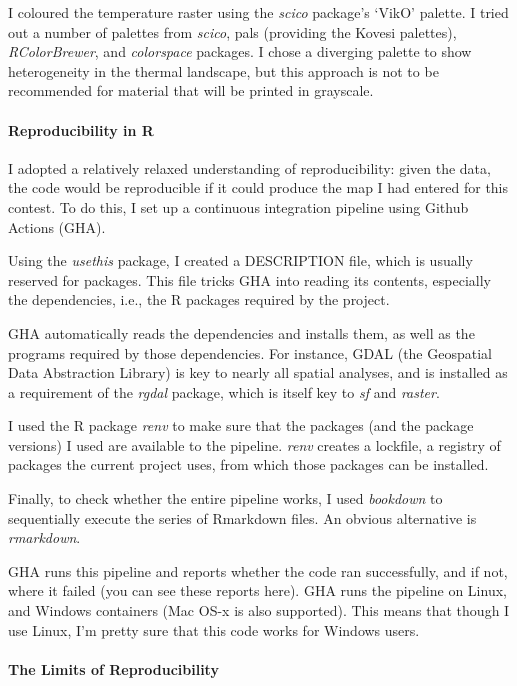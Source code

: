 	I coloured the temperature raster using the \textit{scico} package's `VikO' palette. I tried out a number of palettes from \textit{scico}, pals (providing the Kovesi palettes), \textit{RColorBrewer}, and \textit{colorspace} packages. I chose a diverging palette to show heterogeneity in the thermal landscape, but this approach is not to be recommended for material that will be printed in grayscale.

	\paragraph*{Reproducibility in R}

	I adopted a relatively relaxed understanding of reproducibility: given the data, the code would be reproducible if it could produce the map I had entered for this contest. To do this, I set up a continuous integration pipeline using Github Actions (GHA).

	Using the \textit{usethis} package, I created a DESCRIPTION file, which is usually reserved for packages. This file tricks GHA into reading its contents, especially the dependencies, i.e., the R packages required by the project.

	GHA automatically reads the dependencies and installs them, as well as the programs required by those dependencies. For instance, GDAL (the Geospatial Data Abstraction Library) is key to nearly all spatial analyses, and is installed as a requirement of the \textit{rgdal} package, which is itself key to \textit{sf} and \textit{raster}.

	I used the R package \textit{renv} to make sure that the packages (and the package versions) I used are available to the pipeline. \textit{renv} creates a lockfile, a registry of packages the current project uses, from which those packages can be installed.

	Finally, to check whether the entire pipeline works, I used \textit{bookdown} to sequentially execute the series of Rmarkdown files. An obvious alternative is \textit{rmarkdown}.

	GHA runs this pipeline and reports whether the code ran successfully, and if not, where it failed (you can see these reports here). GHA runs the pipeline on Linux, and Windows containers (Mac OS-x is also supported). This means that though I use Linux, I'm pretty sure that this code works for Windows users.

	\paragraph*{The Limits of Reproducibility}

